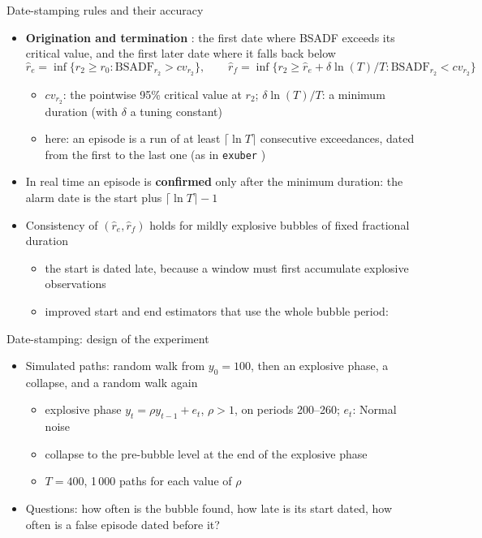 \begin{frame}{Date-stamping rules and their accuracy}
\itemsize{\small}
\begin{itemize}
    \item \textbf{Origination and termination} : the first date where BSADF exceeds its critical value, and the first later date where it falls back below \[ \hat r_e = \inf\{r_2 \ge r_0: \mathrm{BSADF}_{r_2} > cv_{r_2}\}, \qquad \hat r_f = \inf\{r_2 \ge \hat r_e + \delta\ln(T)/T: \mathrm{BSADF}_{r_2} < cv_{r_2}\} \]
    \begin{itemize}
        \item $cv_{r_2}$: the pointwise 95\% critical value at $r_2$; $\delta\ln(T)/T$: a minimum duration (with $\delta$ a tuning constant)
        \item here: an episode is a run of at least $\lceil\ln T\rceil$ consecutive exceedances, dated from the first to the last one (as in \texttt{exuber} )
    \end{itemize}
    \item In real time an episode is \textbf{confirmed} only after the minimum duration: the alarm date is the start plus $\lceil\ln T\rceil - 1$
    \item Consistency of $(\hat r_e, \hat r_f)$ holds for mildly explosive bubbles of fixed fractional duration 
    \begin{itemize}
        \item the start is dated late, because a window must first accumulate explosive observations
        \item improved start and end estimators that use the whole bubble period: 
    \end{itemize}
\end{itemize}
\end{frame}

\begin{frame}{Date-stamping: design of the experiment}
\itemsize{\small}
\begin{itemize}
    \item Simulated paths: random walk from $y_0 = 100$, then an explosive phase, a collapse, and a random walk again
    \begin{itemize}
        \item explosive phase $y_t = \rho y_{t-1} + e_t$, $\rho > 1$, on periods 200--260; $e_t$: Normal noise
        \item collapse to the pre-bubble level at the end of the explosive phase
        \item $T = 400$, 1\,000 paths for each value of $\rho$
    \end{itemize}
    \item Questions: how often is the bubble found, how late is its start dated, how often is a false episode dated before it?
\end{itemize}
\end{frame}

